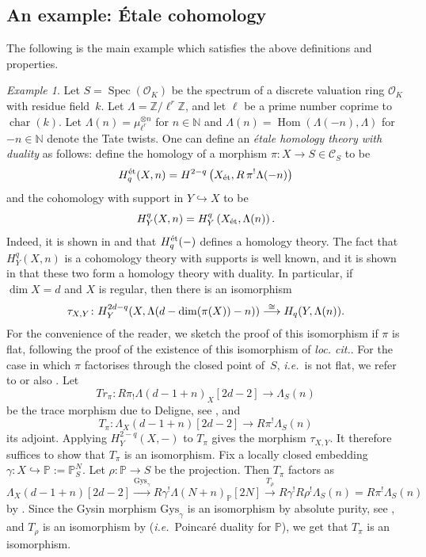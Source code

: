\documentclass[11pt]{amsart}
\numberwithin{equation}{section}
\newtheorem{Key lemma}[theorem]{Key lemma}
\theoremstyle{definition}
\theoremstyle{remark}
\newtheorem{example}[theorem]{Example}
\newcommand{\bb}{\mathbb}
\newcommand{\sub}[1]{{\mbox{\rm \scriptsize #1}}}
\newcommand{\To}{\longrightarrow}
\newcommand{\xto}{\xrightarrow}
\newcommand{\cal}{\mathcal}
\DeclareMathOperator{\Char}{char}
\DeclareMathOperator{\Hom}{Hom}
\DeclareMathOperator{\Spec}{Spec}
\newcommand{\xTo}[1]{\stackrel{#1}{\To}}
\newcommand{\Gys}{\mathrm{Gys}}
\def\lowcong{\vbox to 0pt{\vss\hbox{$\scriptstyle\cong$}\vskip-1.2pt}}
\begin{document}
\subsection{An example: \'Etale cohomology}\label{subsection_example_etale_cohom}
The following is the main example which satisfies the above definitions and properties. 

\begin{example}\label{PBexam3}
Let $S=\Spec (\cal O_K)$ be the spectrum of a  
discrete valuation ring $\cal O_K$ with residue field~$k$. 
Let $\Lambda=\bb Z/\ell^r\bb Z$, and let $\ell$ be a prime number coprime to $\Char(k)$. Let $\Lambda(n)=\mu_{\ell^r}^{\otimes n}$ for $n\in \bb N$ and  $\Lambda(n)=\Hom(\Lambda(-n),\Lambda)$ for $-n\in \bb N$ denote the Tate twists. One can define an \textit{\'etale homology theory with duality} as follows: define the homology of a morphism $\pi\colon X\to S\in \cal C_S$ to be
\[
H^\sub{\'et}_q(X,n) = H^{2-q}\left(X_\sub{\'et} , R\, \pi^! \Lambda (-n)\right) 
\]
and the cohomology with support in $Y\hookrightarrow X$ to be
\[
H_Y^q (X,n ) = H^{q}_Y\left(X_\sub{\'et} ,\Lambda (n)\right) .
\]
Indeed, it is shown in \cite[Example~2.2]{JS03}
and \cite[Proposition~1.5]{SS10} that $H^\sub{\'et}_q(-)$ defines a homology theory. The fact that $H_Y^q (X,n )$ is a  cohomology theory with supports is well known, and it is shown in \cite[Lemma~1.8]{SS10} that these two form a homology theory with duality. In particular, if $\dim X=d$ and $X$ is regular, then there is an isomorphism
$$\tau_{X,Y}\colon H_Y^{2d-q}(X,\Lambda(d-\dim(\pi(X))-n))\xTo{\lowcong} H_q(Y,\Lambda(n)).$$ 
For the convenience of the reader, we sketch the proof of this isomorphism if $\pi$ is flat, following the proof of the existence of this isomorphism of \textit{loc. cit.}. For the case in which $\pi$ factorises through the closed point of~$S$, \textit{i.e.}~is not flat, we refer to \cite[Section~2]{BO74} or also \cite[Lemma~1.8]{SS10}. Let
$$Tr_\pi\colon R\pi_!\Lambda(d-1+n)_X[2d-2]\To \Lambda_S(n)$$
be the trace morphism due to Deligne, see \cite[Theorem XVIII.2.9]{SGA4}, and
$$T_\pi\colon \Lambda_X(d-1+n)[2d-2]\To R\pi^!\Lambda_S(n)$$
its adjoint.
Applying $H^{2-q}_Y(X,-)$ to $T_\pi$ gives the morphism $\tau_{X,Y}$. It therefore suffices to show that $T_\pi$ is an isomorphism. Fix a locally closed embedding $\gamma\colon X\hookrightarrow \bb P:=\bb P^N_S$. Let $ \rho\colon\bb P\to S$ be the projection. Then $T_\pi$ factors as 
$$\Lambda_X(d-1+n)[2d-2]\xto{\Gys_\gamma} R\gamma^!\Lambda(N+n)_{\bb P}[2N] \xTo{T_\rho} R\gamma^!R\rho^! \Lambda_S(n)= R\pi^!\Lambda_S(n)$$
by \cite[Theorem 4.2.3.8(i)]{DeligneSGA}. Since the Gysin morphism $\Gys_\gamma$ is an isomorphism by absolute purity, see \cite{Fuj02}, and $T_\rho$ is an isomorphism by \cite[Theorem XVIII.3.2.5]{SGA4} (\textit{i.e.}~Poincar\'e duality for $\bb P$), we get that $T_\pi$ is an isomorphism.
\end{example}
\end{document}
